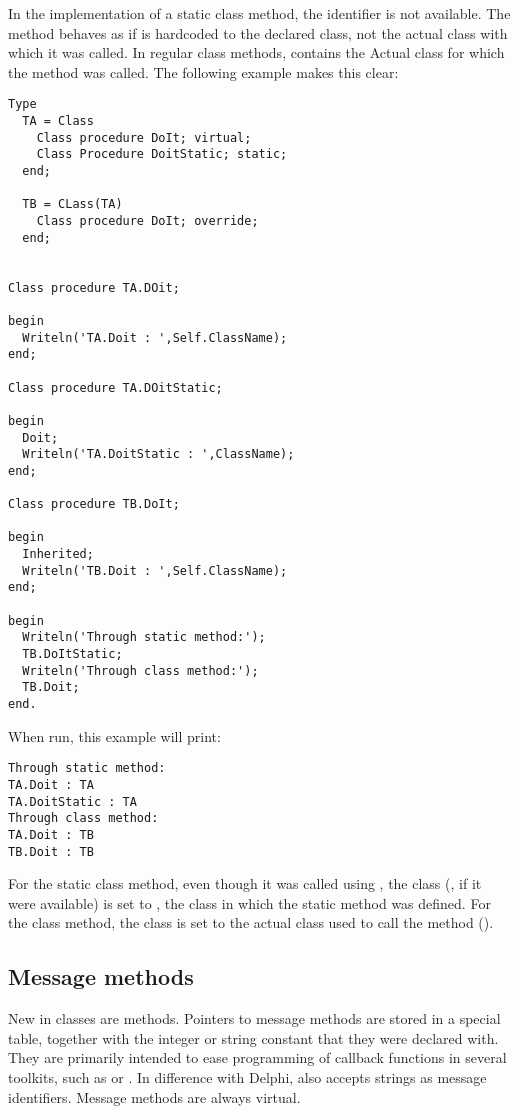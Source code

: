 In the implementation of a static class method, the  identifier is
not available. The method behaves as if  is hardcoded to the
declared class, not the actual class with which it was called. In regular
class methods,  contains the Actual class for which the method was
called.  The following example makes this clear:
\begin{verbatim}
Type
  TA = Class
    Class procedure DoIt; virtual;
    Class Procedure DoitStatic; static;
  end;
  
  TB = CLass(TA)
    Class procedure DoIt; override;
  end;
  
  
Class procedure TA.DOit;

begin
  Writeln('TA.Doit : ',Self.ClassName);
end;

Class procedure TA.DOitStatic;

begin
  Doit;
  Writeln('TA.DoitStatic : ',ClassName);
end;

Class procedure TB.DoIt;

begin
  Inherited;
  Writeln('TB.Doit : ',Self.ClassName);
end;

begin
  Writeln('Through static method:');
  TB.DoItStatic;
  Writeln('Through class method:');
  TB.Doit;
end.
\end{verbatim}
When run, this example will print:
\begin{verbatim}
Through static method:                                                                                                  
TA.Doit : TA                                                                                                            
TA.DoitStatic : TA                                                                                                      
Through class method:
TA.Doit : TB
TB.Doit : TB
\end{verbatim}
For the static class method, even though it was called using , the class
(, if it were available) is set to , the class in which the
static method was defined.
For the class method, the class is set to the actual class used to call the method
().

\subsection{Message methods}
New in classes are  methods. Pointers to message methods are
stored in a special table, together with the integer or string constant that
they were declared with. They are primarily intended to ease programming of
callback functions in several  toolkits, such as  or
. In difference with Delphi, \fpc also accepts strings as message
identifiers. Message methods are always virtual.
 

